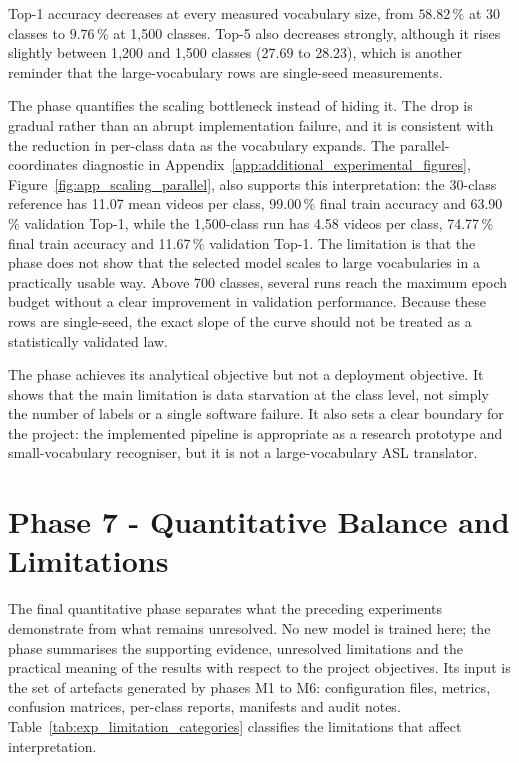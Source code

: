 
\FloatBarrier

Top-1 accuracy decreases at every measured vocabulary size, from $58.82\,\%$ at 30 classes to
$9.76\,\%$ at 1{,}500 classes. Top-5 also decreases strongly, although it rises slightly between
1{,}200 and 1{,}500 classes (27.69 to 28.23), which is another reminder that the large-vocabulary
rows are single-seed measurements.

The phase quantifies the scaling bottleneck instead of hiding it. The drop is gradual rather than
an abrupt implementation failure, and it is consistent with the reduction in per-class data as the
vocabulary expands. The parallel-coordinates diagnostic in
Appendix~\ref{app:additional_experimental_figures}, Figure~\ref{fig:app_scaling_parallel}, also
supports this interpretation: the 30-class reference has 11.07 mean videos per class, 99.00\,\%
final train accuracy and 63.90\,\% validation Top-1, while the 1{,}500-class run has 4.58 videos
per class, 74.77\,\% final train accuracy and 11.67\,\% validation Top-1. The limitation is that
the phase does not show that the selected model scales to large vocabularies in a practically
usable way. Above 700 classes, several runs reach the maximum epoch budget without a clear
improvement in validation performance. Because these rows are single-seed, the exact slope of the
curve should not be treated as a statistically validated law.

The phase achieves its analytical objective but not a deployment objective. It shows that the main
limitation is data starvation at the class level, not simply the number of labels or a single
software failure. It also sets a clear boundary for the project: the implemented pipeline is
appropriate as a research prototype and small-vocabulary recogniser, but it is not a
large-vocabulary ASL translator.

\section{Phase 7 - Quantitative Balance and Limitations}
\label{sec:exp_limitations}

The final quantitative phase separates what the preceding experiments demonstrate from what remains
unresolved. No new model is trained here; the phase summarises the supporting evidence, unresolved
limitations and the practical meaning of the results with respect to the project objectives. Its
input is the set of artefacts generated by phases M1 to M6: configuration files, metrics, confusion
matrices, per-class reports, manifests and audit notes. Table~\ref{tab:exp_limitation_categories}
classifies the limitations that affect interpretation.

